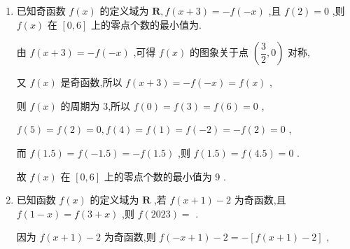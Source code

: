 \begin{enumerate}
\begin{jieda}
        若 $m > 0,n > 0,{2m} \neq  n$ ,且有 $f\left( {2m}\right)  = f\left( n\right)$ ,
        
        则 $\dfrac{{2m} + n}{2} = 2$ ,即 ${2m} + n = 4,{2m} = 4 - n$ ,
        
        $\therefore \dfrac{1}{m} + \dfrac{2m}{n} = \dfrac{1}{m} + \dfrac{4 - n}{n} = \dfrac{1}{m} + \dfrac{4}{n} - 1 = \dfrac{1}{4}\left( {{2m} + n}\right) \left( {\dfrac{1}{m} + \dfrac{4}{n}}\right)  - 1$
        
        $= \dfrac{1}{4}\left( {{2m} + n}\right) \left( {\dfrac{1}{m} + \dfrac{4}{n}}\right)  - 1 = \dfrac{1}{4}\left( {6 + \dfrac{n}{m} + \dfrac{8m}{n}}\right)  - 1$
        
        $\geq  \dfrac{1}{4}\left( {6 + 2\sqrt{\dfrac{n}{m} \cdot  \dfrac{8m}{n}}}\right)  - 1 = \dfrac{1}{2} + \sqrt{2},$
        
        当且仅当 $\dfrac{n}{m} = \dfrac{8m}{n}$ 且 ${2m} + n = 4,m > 0,n > 0$ ,即 $m = 2\left( {\sqrt{2} - 1}\right) ,n = 4\left( {2 - \sqrt{2}}\right)$ 时,等号成立,
        
        故 $\dfrac{1}{m} + \dfrac{2m}{n}$ 的最小值为 $\dfrac{1}{2} + \sqrt{2}$ .
    \end{jieda}
    \item 已知奇函数 $f\left( x\right)$ 的定义域为 $\mathbf{R},f\left( {x + 3}\right)  =  - f\left( {-x}\right)$ ,且 $f\left( 2\right)  = 0$ ,则 $f\left( x\right)$ 在 $\left\lbrack  {0,6}\right\rbrack$ 上的零点个数的最小值为.
    \begin{jieda}
        由 $f\left( {x + 3}\right)  =  - f\left( {-x}\right)$ ,可得 $f\left( x\right)$ 的图象关于点 $\left( {\dfrac{3}{2},0}\right)$ 对称,
        
        又 $f\left( x\right)$ 是奇函数,所以 $f\left( {x + 3}\right)  =  - f\left( {-x}\right)  = f\left( x\right)$ ,
        
        则 $f\left( x\right)$ 的周期为 3,所以 $f\left( 0\right)  = f\left( 3\right)  = f\left( 6\right)  = 0$ ,
        
        $f\left( 5\right)  = f\left( 2\right)  = 0,f\left( 4\right)  = f\left( 1\right)  = f\left( {-2}\right)  =  - f\left( 2\right)  = 0$ ,
        
        而 $f\left( {1.5}\right)  = f\left( {-{1.5}}\right)  =  - f\left( {1.5}\right)$ ,则 $f\left( {1.5}\right)  = f\left( {4.5}\right)  = 0$ .
        
        故 $f\left( x\right)$ 在 $\left\lbrack  {0,6}\right\rbrack$ 上的零点个数的最小值为 9 .
    \end{jieda}
    \item 已知函数 $f\left( x\right)$ 的定义域为 $\mathbf{R}$ ,若 $f\left( {x + 1}\right)  - 2$ 为奇函数,且 $f\left( {1 - x}\right)  = f\left( {3 + x}\right)$ ,则 $f\left( {2023}\right)  =$ .
    \begin{jieda}
        因为 $f\left( {x + 1}\right)  - 2$ 为奇函数,则 $f\left( {-x + 1}\right)  - 2 =  - \left\lbrack  {f\left( {x + 1}\right)  - 2}\right\rbrack$ ,
        

\end{jieda}
\end{enumerate}

